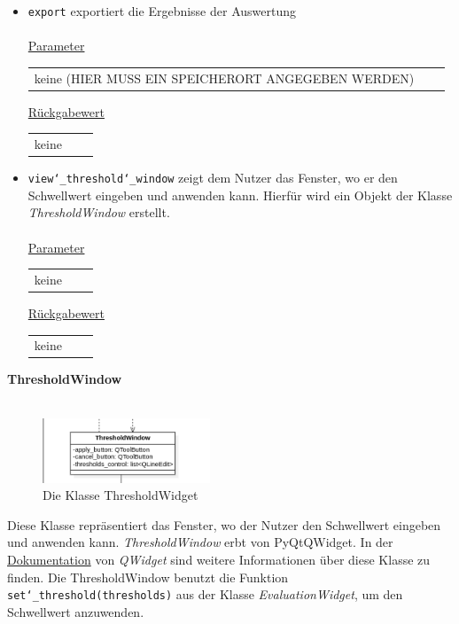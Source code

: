 \documentclass{article}
\begin{document}
\begin{itemize}
\item \texttt{export} \newline exportiert die Ergebnisse der Auswertung 
\\\\
\underline{{Parameter}} 
\begin{tabular}{lll}
 keine (HIER MUSS EIN SPEICHERORT ANGEGEBEN WERDEN)
\end{tabular}

\underline{{Rückgabewert}}
\begin{tabular}{lll}
keine
\end{tabular}

\item \texttt{view\char`_threshold\char`_window} \newline zeigt dem Nutzer das Fenster, wo er den Schwellwert eingeben und anwenden kann. Hierfür wird ein Objekt der Klasse \textit{ThresholdWindow} erstellt.
\\\\
\underline{{Parameter}} 
\begin{tabular}{lll}
keine
\end{tabular}

\underline{{Rückgabewert}}
\begin{tabular}{lll}
keine
\end{tabular}
\end{itemize}

\newpage
\textbf{\large{ThresholdWindow}}\\\\
\begin{figure}[H]%
    \centering
    \includegraphics[width=5cm]{entwurf/Entwurf_dokument/img/Alissa/ThresholdWindow.png}
    \caption{Die Klasse ThresholdWidget}
\end{figure}
Diese Klasse repräsentiert das Fenster, wo der Nutzer den Schwellwert eingeben und anwenden kann. \textit{ThresholdWindow} erbt von PyQt\textendash QWidget. In der \href{https://doc.qt.io/qt-6/qwidget.html}{Dokumentation} von \textit{QWidget} sind weitere Informationen über diese Klasse zu finden. Die ThresholdWindow benutzt die Funktion \texttt{set\char`_threshold(thresholds)} aus der Klasse \textit{EvaluationWidget}, um den Schwellwert anzuwenden.
\newline \newline
\end{document}
